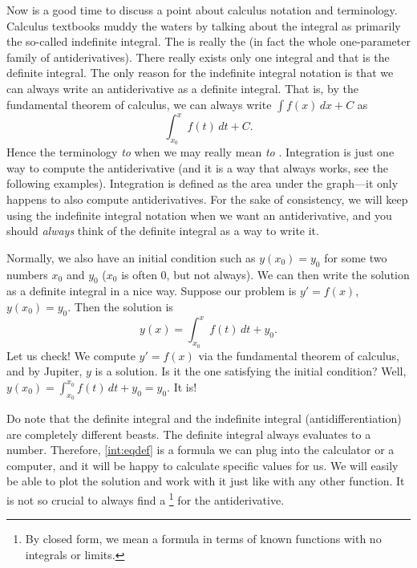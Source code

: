 Now is a good time to discuss a point about
calculus notation and terminology.  Calculus
textbooks muddy the waters by talking about the integral as primarily the
so-called indefinite integral.  The 
is really the \emph{}
(in fact the whole one-parameter family
of antiderivatives).  There really exists only one integral and that
is the definite integral.
The only reason for the indefinite integral notation is that we can always
write an antiderivative as a definite integral.  That is, by the fundamental
theorem of calculus, we can always write
$\int f(x) \,dx + C$ as
\begin{equation*}
\int_{x_0}^x f(t) \,dt + C .
\end{equation*}
Hence the terminology \emph{to } when we may really mean
\emph{to }.
Integration is just one way to compute the
antiderivative (and it is a way that always works, see the following
examples).  Integration is defined as the area under the graph---it
only happens to also compute antiderivatives.
For the sake of consistency, we will keep using the
indefinite integral notation when we want an antiderivative,
and you should \emph{always} think of the definite integral
as a way to write it.

Normally, we also have an initial condition such as $y(x_0) = y_0$
for some two numbers $x_0$ and $y_0$ ($x_0$ is often 0, but not always).
We can then write the solution as a definite integral in a nice way.
Suppose our problem is $y' = f(x)$, $y(x_0) = y_0$.  Then the solution is
\begin{equation} \label{int:eqdef}
y(x) = \int_{x_0}^x f(t) \,dt + y_0 .
\end{equation}
Let us check!
We compute
$y' = f(x)$ via the fundamental theorem of calculus, and by Jupiter, $y$ is a
solution.  Is it the one satisfying the initial condition?  Well,
$y(x_0) = \int_{x_0}^{x_0} f(t)\,dt + y_0 = y_0$.  It is!

Do note that the definite integral and the indefinite integral
(antidifferentiation) are completely different beasts.  The definite integral
always evaluates to a number.  Therefore, \eqref{int:eqdef} is a formula we
can plug into the calculator or a computer, and it will be happy to calculate
specific values for us.  We will easily be able to plot the
solution and work with it just like with any other function.
It is not so crucial to always find a
\footnote{By closed form, we mean a formula in terms
of known functions with no integrals or limits.}
for the antiderivative.

